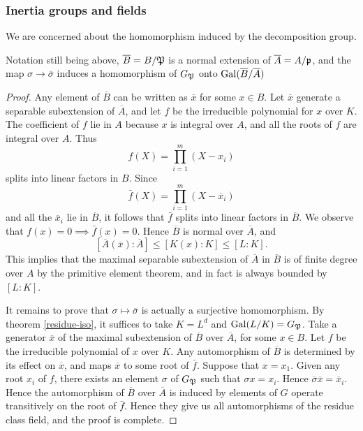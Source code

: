 			
			\subsubsection{Inertia groups and fields}
				We are concerned about the homomorphism induced by the decomposition group.
				\begin{theorem}
					Notation still being above, $\overline{B}=B/\mathfrak{P}$ is a normal extension of $\overline{A}=A/\mathfrak{p}$, and the map $\sigma \to \overline{\sigma}$ induces a homomorphism of $G_\mathfrak{P}$ onto $\operatorname{Gal}(\overline{B}/\overline{A})$
				\end{theorem}
				\begin{proof}
					Any element of $\overline{B}$ can be written as $\overline{x}$ for some $x \in B$. Let $\overline{x}$ generate a separable subextension of $\overline{A}$, and let $f$ be the irreducible polynomial for $x$ over $K$. The coefficient of $f$ lie in $A$ because $x$ is integral over $A$, and all the roots of $f$ are integral over $A$. Thus
					\[
					f(X) = \prod_{i=1}^{m}(X-x_i)
					\]
					splits into linear factors in $B$. Since
					\[
					\bar{f}(X)=\prod_{i=1}^{m}(X-\overline{x}_i)
					\]
					and all the $\overline{x}_i$ lie in $\overline{B}$, it follows that $\bar{f}$ splits into linear factors in $\overline{B}$. We observe that $f(x)=0 \implies \bar{f}(x)=0$. Hence $\overline{B}$ is normal over $\overline{A}$, and
					\[
					[\overline{A}(\overline{x}):\overline{A}] \le [K(x):K] \le [L:K].
					\]
					This implies that the maximal separable subextension of $\overline{A}$ in $\overline{B}$ is of finite degree over $A$ by the primitive element theorem, and in fact is always bounded by $[L:K]$.
					
					It remains to prove that $\sigma \mapsto \overline{\sigma}$ is actually a surjective homomorphism. By theorem \ref{residue-iso}, it suffices to take $K=L^d$ and $\operatorname{Gal}(L/K)=G_\mathfrak{P}$. Take a generator $\overline{x}$ of the maximal subextension of $\overline{B}$ over $\overline{A}$, for some $x \in B$. Let $f$ be the irreducible polynomial of $x$ over $K$. Any automorphism of $\overline{B}$ is determined by its effect on $\overline{x}$, and maps $\overline{x}$ to some root of $\bar{f}$. Suppose that $x=x_1$. Given any root $x_i$ of $f$, there exists an element $\sigma$ of $G_\mathfrak{P}$ such that $\sigma x = x_i$. Hence $\overline{\sigma}\overline{x}=\overline{x}_i$. Hence the automorphism of $\overline{B}$ over $\overline{A}$ is induced by elements of $G$ operate transitively on the root of $\bar{f}$. Hence they give us all automorphisms of the residue class field, and the proof is complete.
				\end{proof}
